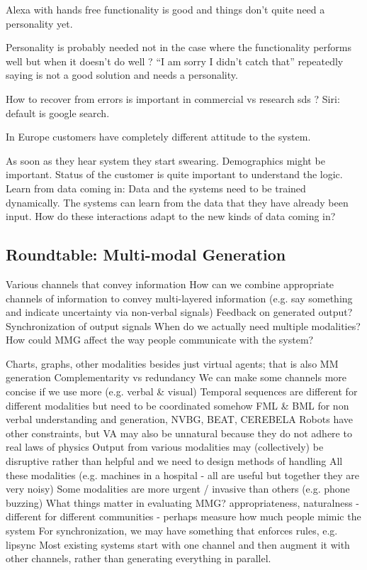 \documentclass[12pt]{article}
\begin{document}
Alexa with hands free functionality is good and things don’t quite need a personality yet.

Personality is probably needed not in the case where the functionality performs well but when it doesn’t do well ? “I am sorry I didn’t catch that” repeatedly saying is not a good solution and needs a personality.

How to recover from errors is important in commercial vs research sds ? Siri: default is google search.

In Europe customers have completely different attitude to the system.

As soon as they hear system they start swearing.
Demographics might be important.
Status of the customer is quite important to understand the logic.
Learn from data coming in: Data and the systems need to be trained dynamically. The systems can learn from the data that they have already been input. How do these interactions adapt to the new kinds of data coming in?


\subsection{Roundtable: Multi-modal Generation}
Various channels that convey information
How can we combine appropriate channels of information to convey multi-layered information (e.g. say something and indicate uncertainty via non-verbal signals)
Feedback on generated output?
Synchronization of output signals
When do we actually need multiple modalities?
How could MMG affect the way people communicate with the system?

Charts, graphs, other modalities besides just virtual agents; that is also MM generation
Complementarity vs redundancy
We can make some channels more concise if we use more (e.g. verbal \& visual)
Temporal sequences are different for different modalities but need to be coordinated somehow
FML \& BML for non verbal understanding and generation, NVBG, BEAT, CEREBELA
Robots have other constraints, but VA may also be unnatural because they do not adhere to real laws of physics
Output from various modalities may (collectively) be disruptive rather than helpful and we need to design methods of handling All these modalities (e.g. machines in a hospital - all are useful but together they are very noisy)
Some modalities are more urgent / invasive than others (e.g. phone buzzing)
What things matter in evaluating MMG? appropriateness, naturalness - different for different communities - perhaps measure how much people mimic the system
For synchronization, we may have something that enforces rules, e.g. lipsync
Most existing systems start with one channel and then augment it with other channels, rather than generating everything in parallel.
\end{document}

